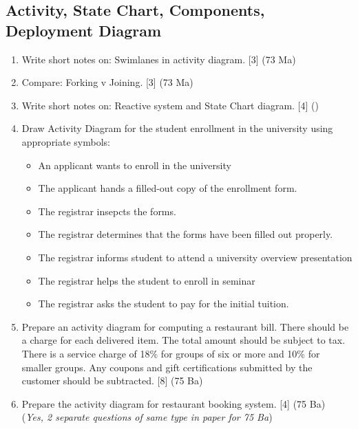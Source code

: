 \documentclass[12pt]{article}
\begin{document}
  \subsection{Activity, State Chart, Components, Deployment Diagram}
    \begin{enumerate}
      \item Write short notes on: Swimlanes in activity diagram. \hfill [3] (73 Ma)

      \item Compare: Forking v Joining. \hfill [3] (73 Ma)

      \item Write short notes on: Reactive system and State Chart diagram.  \hfill [4] ()

      \item Draw Activity Diagram for the student enrollment in the university using appropriate symbols:
        \begin{itemize}[noitemsep, topsep=0pt]
          \item An applicant wants to enroll in the university
          \item The applicant hands a filled-out copy of the enrollment form.
          \item The registrar insepcts the forms.
          \item The registrar determines that the forms have been filled out properly.
          \item The registrar informs student to attend a university overview presentation
          \item The registrar helps the student to enroll in seminar
          \item The registrar asks the student to pay for the initial tuition.
        \end{itemize}

      \item Prepare an activity diagram for computing a restaurant bill. There should be a charge for each delivered item. The total amount should be subject to tax. There is a service charge of 18\% for groups of six or more and 10\% for smaller groups. Any coupons and gift certifications submitted by the customer should be subtracted. \hfill [8] (75 Ba)

      \item Prepare the activity diagram for restaurant booking system. \hfill [4] (75 Ba)\\
        (\textit{Yes, 2 separate questions of same type in paper for 75 Ba})


\end{enumerate}
\end{document}

